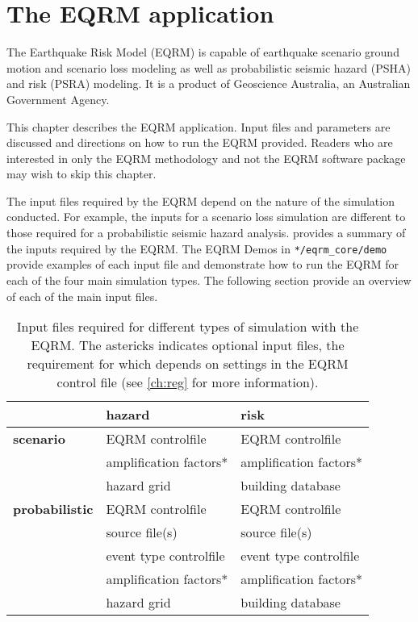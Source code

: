 \chapter{The EQRM application}
\label{ch:application}

The Earthquake Risk Model (EQRM) is capable of earthquake scenario
ground motion and scenario loss modeling as well as probabilistic
seismic hazard (PSHA) and risk (PSRA) modeling. It is a product of
Geoscience Australia, an Australian Government Agency.

This chapter describes the EQRM application. Input files and
parameters are discussed and directions on how to run the EQRM
provided. Readers who are interested in only the EQRM methodology
and not the EQRM software package may wish to skip this chapter.


The input files required by the EQRM depend on the nature of the
simulation conducted. For example, the inputs for a scenario loss
simulation are different to those required for a probabilistic
seismic hazard analysis.  provides a
summary of the inputs required by the EQRM. The EQRM Demos in
\texttt{*/eqrm\_core/demo} provide examples of each input file and
demonstrate how to run the EQRM for each of the four main simulation
types. The following section provide an overview of each of the main
input files.

\begin{table}
\caption{Input files required for different types of simulation with
the EQRM. The astericks indicates optional input files, the
requirement for which depends on settings in the EQRM control file
(see \cref{ch:reg} for more information).}
\label{tab:input-overview} \centering
\begin{tabular}{|l|l|l|}
\hline
 & \textbf{hazard} & \textbf{risk} \\
\hline
\textbf{scenario} & EQRM controlfile & EQRM controlfile \\
  & amplification factors* & amplification factors* \\
  & hazard grid & building database \\
\hline
\textbf{probabilistic} & EQRM controlfile & EQRM controlfile\\
  & source file(s) & source file(s) \\
  & event type controlfile & event type controlfile \\
  & amplification factors* & amplification factors* \\
  & hazard grid & building database \\
\hline
\end{tabular}
\end{table}

